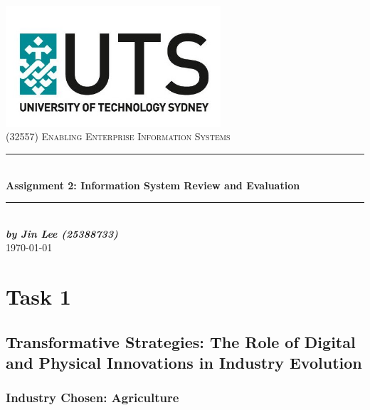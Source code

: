\documentclass[12pt,a4paper]{article}
\begin{document}

\begin{titlepage}

\newcommand{\HRule}{\rule{\linewidth}{0.5mm}}
\center

\vspace*{1\baselineskip}
\includegraphics[width=0.6\textwidth]{images/UTS.png}\\[0.4cm]
\textsc{\Large (32557) Enabling Enterprise Information Systems}\\[0.2cm]

\HRule\\[0.6cm]
{\huge\bfseries Assignment 2: Information System Review and Evaluation}\\[0.4cm]
\HRule\\[7cm]

\textit{\textbf{\Large{by Jin Lee (25388733)}}} \\[3cm]

\vfill
{\large\today}

\vfill

\end{titlepage}


\tableofcontents
\thispagestyle{nofooter}
\cleardoublepage

\pagebreak


\setcounter{page}{1}

\section{Task 1}
\subsection{Transformative Strategies: The Role of Digital and Physical Innovations in Industry Evolution}
\label{sec:Task 1}
\nocite{Task_1.A}

\subsubsection{Industry Chosen: Agriculture}
\end{document}
